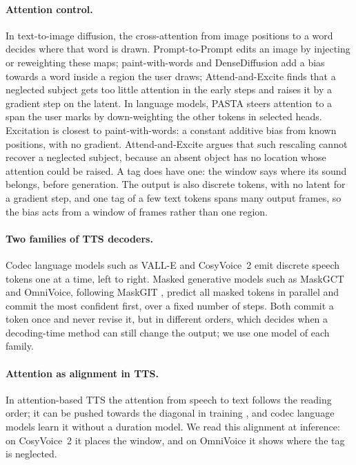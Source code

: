 \documentclass[11pt]{article}
\begin{document}
\paragraph{Attention control.} In text-to-image diffusion, the cross-attention from image positions to a word decides where that word is drawn. Prompt-to-Prompt \citep{hertz2023p2p} edits an image by injecting or reweighting these maps; paint-with-words \citep{balaji2022ediffi} and DenseDiffusion \citep{kim2023dense} add a bias towards a word inside a region the user draws; Attend-and-Excite \citep{chefer2023attend} finds that a neglected subject gets too little attention in the early steps and raises it by a gradient step on the latent. In language models, PASTA \citep{zhang2024pasta} steers attention to a span the user marks by down-weighting the other tokens in selected heads. Excitation is closest to paint-with-words: a constant additive bias from known positions, with no gradient. Attend-and-Excite argues that such rescaling cannot recover a neglected subject, because an absent object has no location whose attention could be raised. A tag does have one: the window says where its sound belongs, before generation. The output is also discrete tokens, with no latent for a gradient step, and one tag of a few text tokens spans many output frames, so the bias acts from a window of frames rather than one region.

\paragraph{Two families of TTS decoders.} Codec language models such as VALL-E \citep{wang2023valle} and CosyVoice~2 emit discrete speech tokens one at a time, left to right. Masked generative models such as MaskGCT \citep{wang2025maskgct} and OmniVoice, following MaskGIT \citep{chang2022maskgit}, predict all masked tokens in parallel and commit the most confident first, over a fixed number of steps. Both commit a token once and never revise it, but in different orders, which decides when a decoding-time method can still change the output; we use one model of each family.

\paragraph{Attention as alignment in TTS.} In attention-based TTS the attention from speech to text follows the reading order; it can be pushed towards the diagonal in training \citep{tachibana2018guided}, and codec language models learn it without a duration model. We read this alignment at inference: on CosyVoice~2 it places the window, and on OmniVoice it shows where the tag is neglected.
\end{document}
